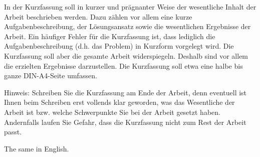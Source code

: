 \kurzfassung

In der Kurzfassung soll in kurzer und prägnanter Weise der wesentliche Inhalt der Arbeit beschrieben werden. Dazu zählen vor allem eine kurze Aufgabenbeschreibung, der Lösungsansatz sowie die wesentlichen Ergebnisse der Arbeit. Ein häufiger Fehler für die Kurzfassung ist, dass lediglich die Aufgabenbeschreibung (d.h. das Problem) in Kurzform vorgelegt wird. Die Kurzfassung soll aber die gesamte Arbeit widerspiegeln. Deshalb sind vor allem die erzielten Ergebnisse darzustellen. Die Kurzfassung soll etwa eine halbe bis ganze DIN-A4-Seite umfassen.

Hinweis: Schreiben Sie die Kurzfassung am Ende der Arbeit, denn eventuell ist Ihnen beim Schreiben erst vollends klar geworden, was das Wesentliche der Arbeit ist bzw. welche Schwerpunkte Sie bei der Arbeit gesetzt haben. Andernfalls laufen Sie Gefahr, dass die Kurzfassung nicht zum Rest der Arbeit passt.

\kurzfassungEN

The same in English.

